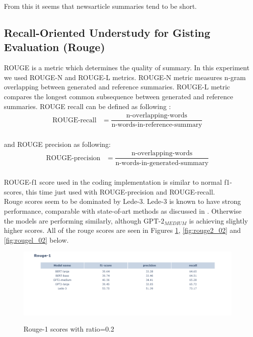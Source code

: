 \documentclass{article}
\newcommand{\gptmedium}{$\text{GPT-2}_{MEDIUM}$ }
\begin{document}
\noindent
From this it seems that newsarticle summaries tend to be short.\\

\subsection{Recall-Oriented Understudy for Gisting Evaluation (Rouge)}

ROUGE is a metric which determines the quality of summary. In this experiment we used ROUGE-N and ROUGE-L metrics. ROUGE-N metric measures n-gram overlapping between generated and reference summaries. ROUGE-L metric compares the longest common subsequence between generated and reference summaries. ROUGE recall can be defined as following \cite{rouge}: \\

\begin{align*}
	\text{ROUGE-recall} &= \dfrac{\text{n-overlapping-words}}{\text{n-words-in-reference-summary}}
\end{align*}\\

\noindent
and ROUGE precision as following:\\

\begin{align*}
	\text{ROUGE-precision} &= \dfrac{\text{n-overlapping-words}}{\text{n-words-in-generated-summary}}
\end{align*}\\

\noindent
ROUGE-f1 score used in the coding implementation is similar to normal f1-scores, this time just used with ROUGE-precision and ROUGE-recall. \cite{rouge}\\

\noindent
Rouge scores seem to be dominated by Lede-3. Lede-3 is known to have strong performance, comparable with state-of-art methods as discussed in \cite{dataset}. Otherwise the models are performing similarly, although \gptmedium is achieving slightly higher scores. All of the rouge scores are seen in Figures \ref{fig:rouge1_02}, \ref{fig:rouge2_02} and \ref{fig:rougel_02} below. 

\begin{figure}[H]
	\centering
	\hspace*{-3cm}
	\includegraphics[scale=0.55]{rouge1.png}\\
	\caption{Rouge-1 scores with ratio=0.2}
	\label{fig:rouge1_02}
\end{figure}
\end{document}
